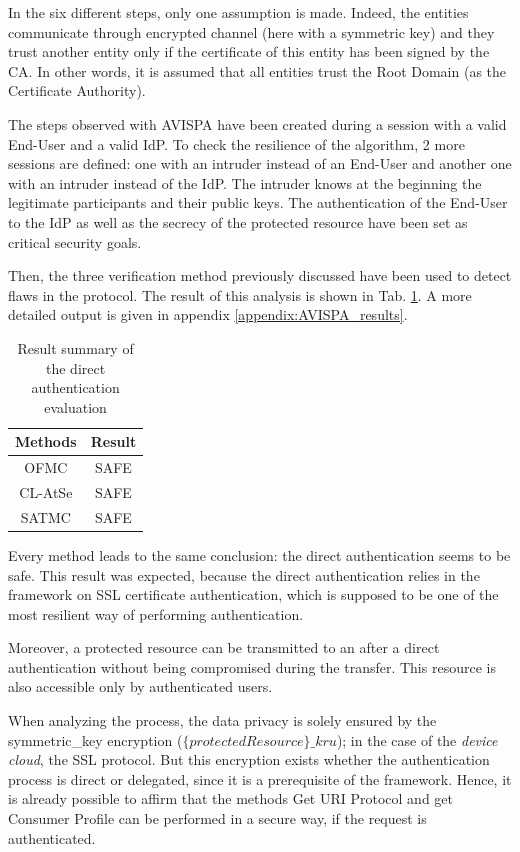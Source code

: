 In the six different steps, only one assumption is made. Indeed, the entities communicate through encrypted channel (here with a symmetric key) and they trust another entity only if the certificate of this entity has been signed by the CA. In other words, it is assumed that all entities trust the Root Domain (as the Certificate Authority).

The steps observed with AVISPA have been created during a session with a valid End-User and a valid IdP. To check the resilience of the algorithm, 2 more sessions are defined: one with an intruder instead of an End-User and another one with an intruder instead of the IdP. The intruder knows at the beginning the legitimate participants and their public keys. The authentication of the End-User to the IdP as well as the secrecy of the protected resource have been set as critical security goals.

Then, the three verification method previously discussed have been used to detect flaws in the protocol. The result of this analysis is shown in Tab. \ref{tab:result_1}. A more detailed output is given in appendix \ref{appendix:AVISPA_results}.

\begin{table}[!hpbt]
	\centering
	\caption{Result summary of the direct authentication evaluation}
	\label{tab:result_1}
	\begin{tabular}{|c|c|}
		\hline Methods &  Result\\ 
		\hline OFMC & SAFE \\ 
		\hline CL-AtSe & SAFE \\ 
		\hline SATMC & SAFE \\ 
		\hline 
	\end{tabular} 
\end{table}

Every method leads to the same conclusion: the direct authentication seems to be safe. This result was expected, because the direct authentication relies in the framework on SSL certificate authentication, which is supposed to be one of the most resilient way of performing authentication. 

Moreover, a protected resource can be transmitted to an after a direct authentication without being compromised during the transfer. This resource is also accessible only by authenticated users.

When analyzing the process, the data privacy is solely ensured by the symmetric\_key encryption ($ \{protectedResource\}\_kru $); in the case of the \emph{device cloud}, the SSL protocol. But this encryption exists whether the authentication process is direct or delegated, since it is a prerequisite of the framework. Hence, it is already possible to affirm that the methods Get URI Protocol and get Consumer Profile can be performed in a secure way, if the request is authenticated.


